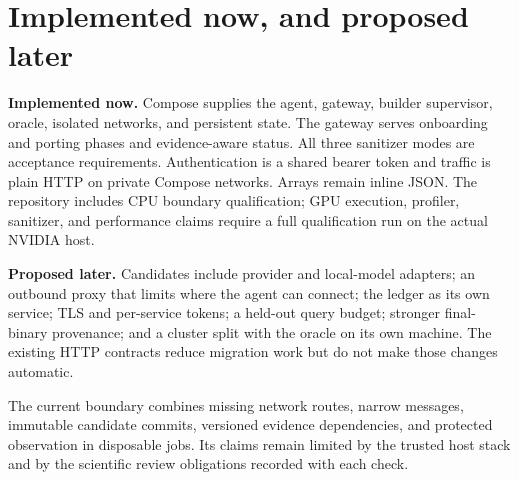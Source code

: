 \documentclass[11pt]{article}
\begin{document}
\section{Implemented now, and proposed later}

\textbf{Implemented now.} Compose supplies the agent, gateway, builder
supervisor, oracle, isolated networks, and persistent state. The gateway serves
onboarding and porting phases and evidence-aware status. All three sanitizer
modes are acceptance requirements. Authentication is a shared bearer token and
traffic is plain HTTP on private Compose networks. Arrays remain inline JSON.
The repository includes CPU boundary qualification; GPU execution, profiler,
sanitizer, and performance claims require a full qualification run on the
actual NVIDIA host.

\textbf{Proposed later.} Candidates include provider and local-model adapters;
an outbound proxy that limits where the agent can connect; the ledger as its
own service; TLS and per-service tokens; a held-out query budget; stronger
final-binary provenance; and a cluster split with the oracle on its own machine.
The existing HTTP contracts reduce migration work but do not make those changes
automatic.

The current boundary combines missing network routes, narrow messages,
immutable candidate commits, versioned evidence dependencies, and protected
observation in disposable jobs. Its claims remain limited by the trusted host
stack and by the scientific review obligations recorded with each check.
\end{document}
